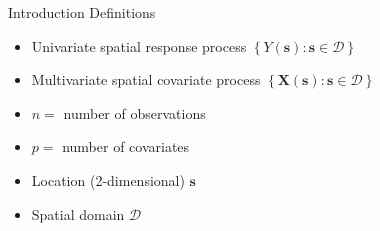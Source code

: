 \documentclass[12pt,t,handout]{beamer}
\newcommand{\subt}[1]{{\footnotesize \color{subtitle} {#1}}}
\begin{document}
\begin{frame}{Introduction}
\subt{Definitions}

\bigskip
\begin{itemize}
    \item Univariate spatial response process $\left\{ Y(\bm{s}) : \bm{s} \in \mathcal{D} \right\}$
    \item Multivariate spatial covariate process $\left\{ \bm{X}(\bm{s}) : \bm{s} \in \mathcal{D} \right\}$
    \item $n = $ number of observations
    \item $p = $ number of covariates
    \item Location (2-dimensional) $\bm{s}$
    \item Spatial domain $\mathcal{D}$
\end{itemize}


\end{frame}




\begin{comment}
\begin{frame}{Introduction}
\subt{Types of spatial data}

\bigskip
\begin{itemize}
    \item Geostatistical data:
    \begin{itemize}
        \item Observations are made at sampling locations $\bm{s}_i$ for $i = 1, \dots, n$
        \item E.g. elevation, temperature
    \end{itemize}
    \item Areal data:
    \begin{itemize}
        \item Domain is partitioned into $n$ regions $\left\{ D_1, \dots, D_n \right\}$
        \item The regions do not overlap, and they divide the domain completely: $\mathcal{D} = \bigcup_{i=1}^n D_i$
        \item Centroids of the regions are considered to be the sampling locations $\bm{s}_i$ for $i = 1, \dots, n$
        \item E.g. poverty rate, population, spatial mean temperature
    \end{itemize}
\end{itemize}


\note{The method I'm describing applies to geostatistical data, or to areal data when the observations are assumed to be located at the centroid.

The poverty data example is areal data; the simulation study I'll present later is based on simulated geostatistical data.}
\end{frame}
\end{comment}
\end{document}
